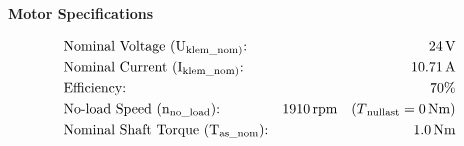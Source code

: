 \begin{center}
    \textbf{Motor Specifications}
\end{center} 

\begin{align*}
    &\text{Nominal Voltage (U\textsubscript{klem\_nom)}:} & 24 \, \text{V} \\
    &\text{Nominal Current (I\textsubscript{klem\_nom)}:} & 10.71 \, \text{A} \\
    &\text{Efficiency:} & 70\% \\
    &\text{No-load Speed (n\textsubscript{no\_load}):} & 1910 \, \text{rpm} \quad (T\textsubscript{nullast} = 0 \, \text{Nm}) \\
    &\text{Nominal Shaft Torque (T\textsubscript{as\_nom}):} & 1.0 \, \text{Nm}
\end{align*}


